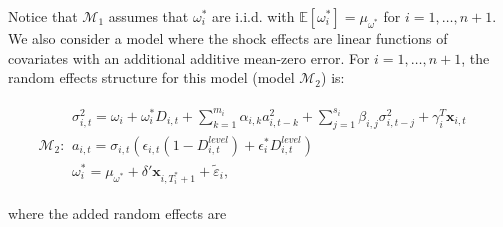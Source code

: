 \documentclass[11pt]{article}
\newcommand{\x}{\textbf{x}}
\def\mbf#1{\mathbf{#1}} %
\def\t#1{\tilde{#1}} %
\def\mc#1{\mathcal{#1}} %
\def\E{\mathbb{E}} %
\def\mc#1{\mathcal{#1}}
\theoremstyle{definition}
\begin{document}
Notice that $\mc{M}_1$ assumes that $\omega^{*}_i$ are i.i.d. with $\E[ \omega^{*}_i]=\mu_{\omega^{*}}$ 
for $i = 1, \ldots, n+1$. We also consider a model where the shock effects are linear functions of covariates with an additional additive mean-zero error. For $i = 1, \ldots, n+1$, the random effects structure for this model (model $\mc{M}_2$) is:

\begin{align}
\mc{M}_2 \colon \begin{array}{l}
   \sigma^{2}_{i,t} = \omega_{i} + \omega^{*}_i D_{i,t}  + \sum^{m_{i}}_{k=1}\alpha_{i,k}a^{2}_{i,t-k} + \sum_{j=1}^{s_{i}}\beta_{i,j}\sigma_{i,t-j}^{2} + \gamma_{i}^{T} \x_{i,t} \text{ }\\[.2cm]
   a_{i,t} = \sigma_{i,t}(\epsilon_{i,t}(1-D^{level}_{i,t}) + \epsilon^{*}_{i}D^{level}_{i,t})\\[.2cm]
   \omega_i^{*} = \mu_{\omega^{*}}+\delta'\mbf{x}_{i, T_i^*+1}+ \t{\varepsilon}_{i},
\end{array}\label{model2}
\end{align}

 where the added random effects are
\end{document}
